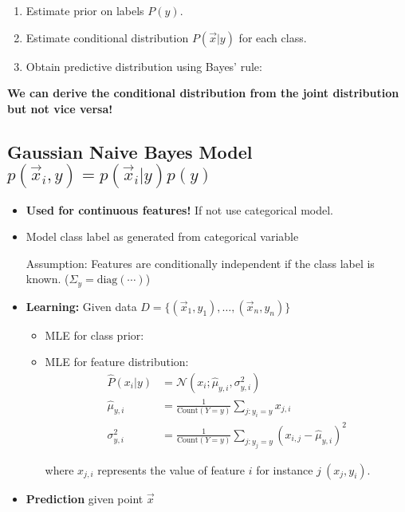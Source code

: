 \documentclass[8pt,a4paper]{scrartcl}
\begin{document}
\begin{multicols*}{3}
\begin{enumerate}
\ncompaq
\item Estimate prior on labels $P(y)$.
\item Estimate conditional distribution $P(\vec{x}|y)$ for each class.
\item Obtain predictive distribution using Bayes' rule:

\end{enumerate}

\textbf{We can derive the conditional distribution from the joint distribution but not vice versa!}

\subsection{Gaussian Naive Bayes Model $p(\vec{x}_i,y)=p(\vec{x}_i|y)p(y)$}

\begin{itemize}
\ncompaq
\item \textbf{Used for continuous features!} If not use categorical model.
\item Model class label as generated from categorical variable


Assumption: Features are conditionally independent if the class label is known. ($\Sigma_y=\text{diag}(\cdots)$)

\item \textbf{Learning:} Given data $D=\{(\vec{x}_1,y_1),\ldots,(\vec{x}_n,y_n)\}$
\begin{itemize}
\ncompaq
\item MLE for class prior: 

\item MLE for feature distribution:
\begin{align*}
\hat{P}(x_i|y)&=\mathcal{N}(x_i;\hat{\mu}_{y,i},\sigma_{y,i}^2)\\
\hat{\mu}_{y,i}&=\frac{1}{\text{Count}(Y=y)}\sum\limits_{j:y_i=y}x_{j,i}\\
\sigma_{y,i}^2&=\frac{1}{\text{Count}(Y=y)}\sum\limits_{j:y_j=y}(x_{i,j}-\hat{\mu}_{y,i})^2
\end{align*}

where $x_{j,i}$ represents the value of feature $i$ for instance $j\ (x_j,y_i)$.
\end{itemize}
\item \textbf{Prediction} given point $\vec{x}$


\end{itemize}
\end{multicols*}
\end{document}
